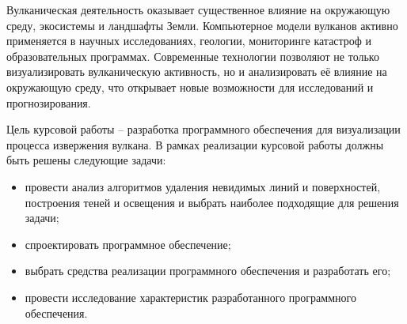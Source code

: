 
Вулканическая деятельность оказывает существенное влияние на окружающую среду, экосистемы и ландшафты Земли. Компьютерное модели вулканов активно применяется в научных исследованиях, геологии, мониторинге катастроф и образовательных программах. Современные технологии позволяют не только визуализировать вулканическую активность, но и анализировать её влияние на окружающую среду, что открывает новые возможности для исследований и прогнозирования.\cite{lit1}

Цель курсовой работы -- разработка программного обеспечения для визуализации процесса извержения вулкана.
В рамках реализации курсовой работы должны быть решены следующие задачи:
\begin{itemize}
	\item провести анализ алгоритмов  удаления невидимых линий и поверхностей, построения теней и освещения и выбрать наиболее подходящие для решения задачи;
	\item спроектировать программное обеспечение;
	\item выбрать средства реализации программного обеспечения и разработать его;
	\item провести исследование характеристик разработанного программного обеспечения.
\end{itemize}

